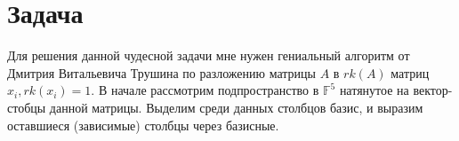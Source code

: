     \section*{Задача }
        Для решения данной чудесной задачи мне нужен гениальный алгоритм от Дмитрия Витальевича Трушина 
        по разложению матрицы $A$ в $rk(A)$ матриц $x_i, {rk(x_i)=1}$.
        В начале рассмотрим подпространство в $\mathds{F}^5$ натянутое на вектор-стобцы данной матрицы. Выделим среди данных столбцов базис, и выразим оставшиеся (зависимые) столбцы через базисные.
